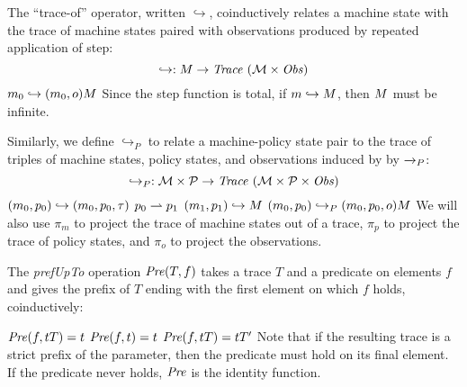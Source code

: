 \documentclass[acmsmall,review,anonymous]{acmart}\settopmatter{printfolios=true,printccs=false,printacmref=false}
\begin{document}
The ``trace-of'' operator, written \(\hookrightarrow\), coinductively
relates a machine state with the trace of machine states paired with
observations produced by repeated application of step:  
%
\[\hookrightarrow : M \rightarrow \mathit{Trace}~({\mathcal M} \times \mathit{Obs})\]%
%
            {\(m_0 \hookrightarrow (m_0,o) M\)}%
%
\noindent
Since the step function is total, if \(m \hookrightarrow M\),
then \(M\) must be infinite.


Similarly, we define \(\hookrightarrow_P\) to relate a machine-policy
state pair to the trace of triples of machine states, policy states,
and observations induced by by \(\xrightarrow{}_P\): 
%
\[\hookrightarrow_P : {\mathcal M} \times \mathcal{P} \rightarrow \mathit{Trace}~({\mathcal M} \times \mathcal{P} \times \mathit{Obs}) \]
%
         {\((m_0,p_0) \hookrightarrow (m_0,p_0,\tau)\)}
%
              {\(p_0 \rightharpoonup p_1\)}
              {\((m_1,p_1) \hookrightarrow M\)}
              {\((m_0,p_0) \hookrightarrow_P (m_0,p_0,o) M\)}
We will also use \(\pi_m\) to project the trace of machine states
out of a trace, \(\pi_p\) to project the trace of policy states, and
\(\pi_o\) to project the observations.  

The {\it prefUpTo} operation \(\mathit{Pre}(T,f)\) 
takes a trace \(T\)
and a predicate on elements \(f\) and gives the prefix of \(T\)
ending with the first element on which \(f\) holds, coinductively:

         {\(\mathit{Pre}(f,tT) = t\)}
%
\judgment{}
         {\(\mathit{Pre}(f,t) = t\)}
%
            {\(\mathit{Pre}(f,tT) = tT'\)}
%
Note that if the resulting trace is a strict prefix of the parameter, then the
predicate must hold on its final element. If the predicate never holds,
\(\mathit{Pre}\) is the identity function.
\end{document}
